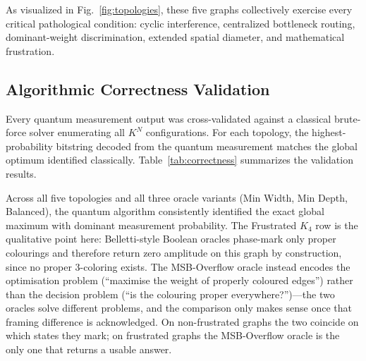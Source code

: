 \documentclass{ieeeaccess}
\begin{document}
As visualized in Fig.~\ref{fig:topologies}, these five graphs collectively exercise every critical pathological condition: cyclic interference, centralized bottleneck routing, dominant-weight discrimination, extended spatial diameter, and mathematical frustration.

\subsection{Algorithmic Correctness Validation}
Every quantum measurement output was cross-validated against a classical brute-force solver enumerating all $K^N$ configurations. For each topology, the highest-probability bitstring decoded from the quantum measurement matches the global optimum identified classically. Table~\ref{tab:correctness} summarizes the validation results.

\begin{table}[htbp]
\caption{Correctness Validation: Quantum vs. Classical Brute-Force}
\label{tab:correctness}
\centering
{}
\end{table}

Across all five topologies and all three oracle variants (Min Width, Min Depth, Balanced), the quantum algorithm consistently identified the exact global maximum with dominant measurement probability. The Frustrated $K_4$ row is the qualitative point here: Belletti-style Boolean oracles phase-mark only proper colourings and therefore return zero amplitude on this graph by construction, since no proper $3$-coloring exists. The MSB-Overflow oracle instead encodes the optimisation problem (``maximise the weight of properly coloured edges'') rather than the decision problem (``is the colouring proper everywhere?'')---the two oracles solve different problems, and the comparison only makes sense once that framing difference is acknowledged. On non-frustrated graphs the two coincide on which states they mark; on frustrated graphs the MSB-Overflow oracle is the only one that returns a usable answer.
\end{document}

